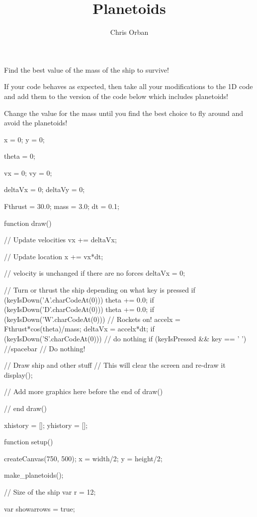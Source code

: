 \documentclass{ximera}
\author{Chris Orban}
\title{Planetoids}
\begin{document}
\begin{abstract}
\end{abstract}
\maketitle

Find the best value of the mass of the ship to survive!

If your code behaves as expected, then take all your modifications to
the 1D code and add them to the version of the code below which
includes planetoids!

Change the value for the mass until you find the best choice to fly
around and avoid the planetoids!

\begin{javascriptCode}
  x = 0;
y = 0;

theta = 0;

vx = 0;
vy = 0;

deltaVx = 0;
deltaVy = 0;

Fthrust = 30.0;
mass = 3.0;
dt = 0.1;

function draw(){
    // Update velocities
    vx += deltaVx;

    // Update location
    x += vx*dt;

    // velocity is unchanged if there are no forces
    deltaVx = 0;
    
    // Turn or thrust the ship depending on what key is pressed
    if (keyIsDown('A'.charCodeAt(0))) {
        theta += 0.0;
    }
    if (keyIsDown('D'.charCodeAt(0))) {
        theta += 0.0;
    }
    if (keyIsDown('W'.charCodeAt(0))) {
        // Rockets on!
        accelx = Fthrust*cos(theta)/mass;
        deltaVx = accelx*dt;
    }
    if (keyIsDown('S'.charCodeAt(0))) {
            // do nothing
    }
    if (keyIsPressed && key == ' '){ //spacebar
			// Do nothing!
    }

    // Draw ship and other stuff
    // This will clear the screen and re-draw it
    display();

    // Add more graphics here before the end of draw()

  } // end draw()

  xhistory = [];
yhistory = [];

function setup(){
    createCanvas(750, 500);
    x = width/2;
    y = height/2;

    make_planetoids();
}

// Size of the ship
var r = 12;

var showarrows = true;


\end{javascriptCode}
\end{document}
